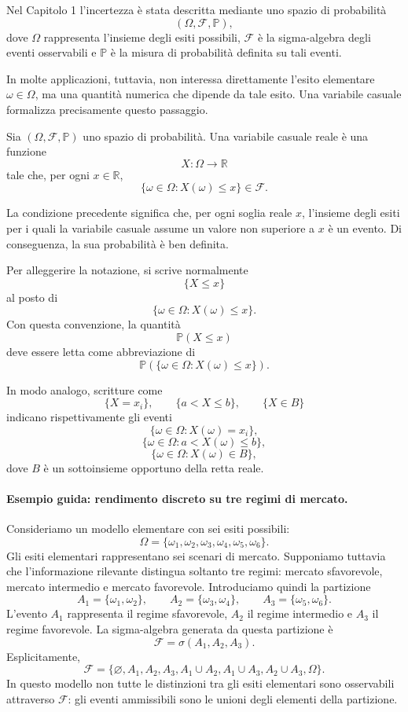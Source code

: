 Nel Capitolo 1 l'incertezza \`{e} stata descritta mediante uno spazio di
probabilit\`{a}
\[
(\Omega,\mathcal{F},\mathbb{P}),
\]
dove $\Omega$ rappresenta l'insieme degli esiti possibili, $\mathcal{F}$ \`{e}
la sigma-algebra degli eventi osservabili e $\mathbb{P}$ \`{e} la misura di
probabilit\`{a} definita su tali eventi.

In molte applicazioni, tuttavia, non interessa direttamente l'esito elementare
$\omega\in\Omega$, ma una quantit\`{a} numerica che dipende da tale esito. Una
variabile casuale formalizza precisamente questo passaggio.

\begin{definition}
Sia $(\Omega,\mathcal{F},\mathbb{P})$ uno spazio di
probabilit\`{a}. Una variabile casuale reale \`{e} una funzione
\[
X:\Omega\longrightarrow\mathbb{R}
\]
tale che, per ogni $x\in\mathbb{R}$,
\[
\{\omega\in\Omega:X(\omega)\leq x\}\in\mathcal{F}.
\]

\end{definition}

La condizione precedente significa che, per ogni soglia reale $x$, l'insieme
degli esiti per i quali la variabile casuale assume un valore non superiore a
$x$ \`{e} un evento. Di conseguenza, la sua probabilit\`{a} \`{e} ben definita.

Per alleggerire la notazione, si scrive normalmente
\[
\{X\leq x\}
\]
al posto di
\[
\{\omega\in\Omega:X(\omega)\leq x\}.
\]
Con questa convenzione, la quantit\`{a}
\[
\mathbb{P}(X\leq x)
\]
deve essere letta come abbreviazione di
\[
\mathbb{P}(\{\omega\in\Omega:X(\omega)\leq x\}).
\]


In modo analogo, scritture come
\[
\{X=x_{i}\},\qquad\{a<X\leq b\},\qquad\{X\in B\}
\]
indicano rispettivamente gli eventi
\[
\{\omega\in\Omega:X(\omega)=x_{i}\},
\]
\[
\{\omega\in\Omega:a<X(\omega)\leq b\},
\]
\[
\{\omega\in\Omega:X(\omega)\in B\},
\]
dove $B$ \`{e} un sottoinsieme opportuno della retta reale.

\paragraph{Esempio guida: rendimento discreto su tre regimi di mercato.}

Consideriamo un modello elementare con sei esiti possibili:
\[
\Omega=\{\omega_{1},\omega_{2},\omega_{3},\omega_{4},\omega_{5},\omega_{6}\}.
\]
Gli esiti elementari rappresentano sei scenari di mercato. Supponiamo tuttavia
che l'informazione rilevante distingua soltanto tre regimi: mercato
sfavorevole, mercato intermedio e mercato favorevole. Introduciamo quindi la
partizione
\[
A_{1}=\{\omega_{1},\omega_{2}\}, \qquad A_{2}=\{\omega_{3},\omega_{4}\},
\qquad A_{3}=\{\omega_{5},\omega_{6}\}.
\]
L'evento $A_{1}$ rappresenta il regime sfavorevole, $A_{2}$ il regime
intermedio e $A_{3}$ il regime favorevole. La sigma-algebra generata da questa
partizione \`{e}
\[
\mathcal{F}=\sigma(A_{1},A_{2},A_{3}).
\]
Esplicitamente,
\[
\mathcal{F}= \{\varnothing, A_{1},A_{2},A_{3}, A_{1}\cup A_{2},A_{1}\cup
A_{3},A_{2}\cup A_{3}, \Omega\}.
\]
In questo modello non tutte le distinzioni tra gli esiti elementari sono
osservabili attraverso $\mathcal{F}$: gli eventi ammissibili sono le unioni
degli elementi della partizione.

